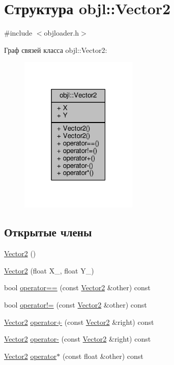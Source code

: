 \hypertarget{structobjl_1_1_vector2}{}\section{Структура objl\+:\+:Vector2}
\label{structobjl_1_1_vector2}


{\ttfamily \#include $<$objloader.\+h$>$}



Граф связей класса objl\+:\+:Vector2\+:
\nopagebreak
\begin{figure}[H]
\begin{center}
\leavevmode
\includegraphics[width=159pt]{d4/d8a/structobjl_1_1_vector2__coll__graph}
\end{center}
\end{figure}
\subsection*{Открытые члены}
\begin{DoxyCompactItemize}
\item 
\hyperlink{structobjl_1_1_vector2_abca84763e73ad0c32dd10ef1c87a86a4}{Vector2} ()
\item 
\hyperlink{structobjl_1_1_vector2_a011c4cfca74a240d9ac50fbf8400c781}{Vector2} (float X\+\_\+, float Y\+\_\+)
\item 
bool \hyperlink{structobjl_1_1_vector2_a79a3733f50a038299d4c5adf41d95c2a}{operator==} (const \hyperlink{structobjl_1_1_vector2}{Vector2} \&other) const 
\item 
bool \hyperlink{structobjl_1_1_vector2_ab73ea0ab43cbec8b1b75a6a2de60e7df}{operator!=} (const \hyperlink{structobjl_1_1_vector2}{Vector2} \&other) const 
\item 
\hyperlink{structobjl_1_1_vector2}{Vector2} \hyperlink{structobjl_1_1_vector2_a7fe3352f0f3e442a047867b79d8cea21}{operator+} (const \hyperlink{structobjl_1_1_vector2}{Vector2} \&right) const 
\item 
\hyperlink{structobjl_1_1_vector2}{Vector2} \hyperlink{structobjl_1_1_vector2_ab47d3a9c104a32e72706ebd5089266ef}{operator-\/} (const \hyperlink{structobjl_1_1_vector2}{Vector2} \&right) const 
\item 
\hyperlink{structobjl_1_1_vector2}{Vector2} \hyperlink{structobjl_1_1_vector2_ae0c8bd6d04d2d514b11f6039ff4099ed}{operator$\ast$} (const float \&other) const 
\end{DoxyCompactItemize}
